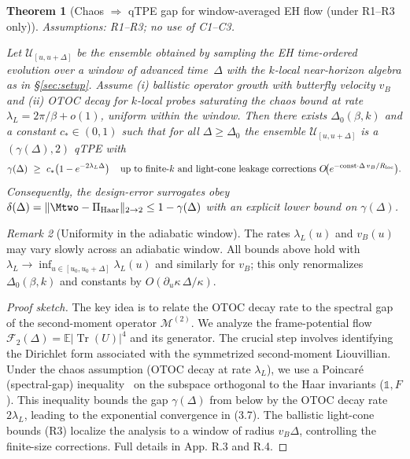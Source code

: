 \documentclass[11pt,a4paper]{article}
\newcommand{\Tr}{\operatorname{Tr}}
\theoremstyle{plain}
\newtheorem{theorem}{Theorem}
\theoremstyle{definition}
\theoremstyle{remark}
\newtheorem{remark}[theorem]{Remark}
\begin{document}
\begin{theorem}[Chaos $\Rightarrow$ qTPE gap for window-averaged EH flow (under R1--R3 only)]\label{thm:chaos-to-gap}
\emph{Assumptions:} R1--R3; no use of C1--C3.

Let $\mathcal{U}_{[u,u+\Delta]}$ be the ensemble obtained by sampling the EH time-ordered evolution over a window of advanced time~$\Delta$ with the $k$-local near-horizon algebra as in \S\ref{sec:setup}. Assume (i) ballistic operator growth with butterfly velocity $v_B$ and (ii) OTOC decay for $k$-local probes saturating the chaos bound at rate $\lambda_L=2\pi/\beta+o(1)$, uniform within the window. Then there exists $\Delta_0(\beta,k)$ and a constant $c_* \in (0,1)$ such that for all $\Delta\ge \Delta_0$ the ensemble $\mathcal{U}_{[u,u+\Delta]}$ is a $(\gamma(\Delta),2)$ qTPE with
\begin{equation}\label{eq:gamma-lower}
\gamma(\Delta)\ \ge\ c_*\!\left(1-e^{-2\lambda_L\Delta}\right) 
\quad\text{up to finite-$k$ and light-cone leakage corrections } 
O\!\big(e^{-\mathrm{const}\cdot \Delta\, v_B/R_{\rm loc}}\big).
\end{equation}
Consequently, the design-error surrogates obey $\delta(\Delta)=\|\Mtwo-\Pi_{\rm Haar}\|_{2\to 2}\le 1-\gamma(\Delta)$ with an explicit lower bound on $\gamma(\Delta)$.
\end{theorem}
\begin{remark}[Uniformity in the adiabatic window]\label{rem:uniformity-window}
The rates $\lambda_L(u)$ and $v_B(u)$ may vary slowly across an adiabatic window. All bounds above hold with $\lambda_L\to\inf_{u\in[u_0,u_0+\Delta]}\lambda_L(u)$ and similarly for $v_B$; this only renormalizes $\Delta_0(\beta,k)$ and constants by $O(\partial_u \kappa\,\Delta/\kappa)$.
\end{remark}
\begin{proof}[Proof sketch]
The key idea is to relate the OTOC decay rate to the spectral gap of the second-moment operator $\mathcal{M}^{(2)}$. We analyze the frame-potential flow $\mathcal{F}_2(\Delta)=\mathbb{E}|\Tr(U)|^{4}$ and its generator. The crucial step involves identifying the Dirichlet form associated with the symmetrized second-moment Liouvillian. Under the chaos assumption (OTOC decay at rate $\lambda_L$), we use a Poincaré (spectral-gap) inequality~\cite{RobertsYoshida:2017} on the subspace orthogonal to the Haar invariants ($\mathbb{1}, F$). This inequality bounds the gap $\gamma(\Delta)$ from below by the OTOC decay rate $2\lambda_L$, leading to the exponential convergence in (3.7). The ballistic light-cone bounds (R3) localize the analysis to a window of radius $v_B\Delta$, controlling the finite-size corrections.
Full details in App. R.3 and R.4.
\end{proof}
\end{document}

